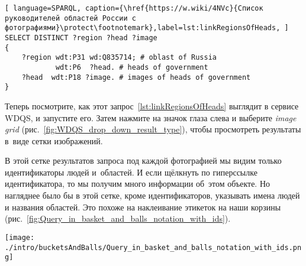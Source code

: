 \begin{lstlisting}[ language=SPARQL, caption={\href{https://w.wiki/4NVc}{Список руководителей областей России с фотографиями}\protect\footnotemark},label=lst:linkRegionsOfHeads, ]
SELECT DISTINCT ?region ?head ?image
{
    ?region wdt:P31 wd:Q835714; # oblast of Russia
            wdt:P6  ?head. # heads of government
    ?head  wdt:P18 ?image. # images of heads of government
}
\end{lstlisting}




\newpage 
Теперь посмотрите, как этот запрос~\ref{lst:linkRegionsOfHeads} выглядит в сервисе WDQS, и запустите его. 
Затем нажмите на значок глаза слева и выберите \textit{image grid} 
(рис.~\ref{fig:WDQS_drop_down_result_type}), чтобы просмотреть результаты в~виде сетки изображений.

\begin{marginfigure}
	{
		\setlength{\fboxsep}{0pt}%
		\setlength{\fboxrule}{1pt}%
	}
    \caption[Выбор отображения результатов запроса в виде сетки изображений.]
            {Выбор отображения результатов запроса в виде \textit{image grid}\\(сетки изображений)}
	\label{fig:WDQS_drop_down_result_type}
\end{marginfigure}

В этой сетке результатов запроса 
под каждой фотографией мы видим только идентификаторы людей и~областей. 
И если щёлкнуть по гиперссылке идентификатора, то мы получим много информации об~этом объекте. 
Но нагляднее было бы в этой сетке, кроме идентификаторов, указывать имена людей и названия областей. 
Это похоже на наклеивание этикеток на наши корзины (рис.~\ref{fig:Query_in_basket_and_balls_notation_with_ids}).

\begin{marginfigure}
\texttt{[image: ./intro/bucketsAndBalls/Query\_in\_basket\_and\_balls\_notation\_with\_ids.png]}
\caption{Запрос в нотации <<Корзины и мячи>> с~номерами свойств\\и~объектов Викиданных}
\label{fig:Query_in_basket_and_balls_notation_with_ids}
\end{marginfigure}

